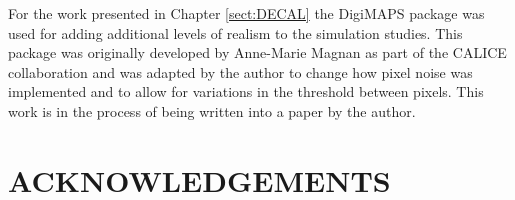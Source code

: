 For the work presented in Chapter \ref{sect:DECAL} the DigiMAPS package was used for adding additional levels of realism to the simulation studies. This package was originally developed by Anne-Marie Magnan as part of the \ac{CALICE} collaboration and was adapted by the author to change how pixel noise was implemented and to allow for variations in the threshold between pixels. This work is in the process of being written into a paper by the author.

%
\clearpage
\chapter*{ACKNOWLEDGEMENTS}
%


